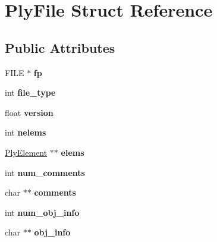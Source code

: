 \hypertarget{struct_ply_file}{}\section{Ply\+File Struct Reference}
\label{struct_ply_file}
\subsection*{Public Attributes}
\begin{DoxyCompactItemize}
\item 
F\+I\+LE $\ast$ {\bfseries fp}\hypertarget{struct_ply_file_affa03cb65d7afdc1b54ba1930da1e0ce}{}\label{struct_ply_file_affa03cb65d7afdc1b54ba1930da1e0ce}

\item 
int {\bfseries file\+\_\+type}\hypertarget{struct_ply_file_ac8f47215e1cab6332c4a91735faceac1}{}\label{struct_ply_file_ac8f47215e1cab6332c4a91735faceac1}

\item 
float {\bfseries version}\hypertarget{struct_ply_file_a54079430fc47c9303c194ecffaf9392d}{}\label{struct_ply_file_a54079430fc47c9303c194ecffaf9392d}

\item 
int {\bfseries nelems}\hypertarget{struct_ply_file_a2d94dc0c534e364b232d1ea41d64c1f1}{}\label{struct_ply_file_a2d94dc0c534e364b232d1ea41d64c1f1}

\item 
\hyperlink{struct_ply_element}{Ply\+Element} $\ast$$\ast$ {\bfseries elems}\hypertarget{struct_ply_file_aa123ddfd8c89539dde7644d121082432}{}\label{struct_ply_file_aa123ddfd8c89539dde7644d121082432}

\item 
int {\bfseries num\+\_\+comments}\hypertarget{struct_ply_file_a033842a20f0620979d992898f6a52a14}{}\label{struct_ply_file_a033842a20f0620979d992898f6a52a14}

\item 
char $\ast$$\ast$ {\bfseries comments}\hypertarget{struct_ply_file_afe9f3f406d4ae2ae20d9ed0bfb9a990f}{}\label{struct_ply_file_afe9f3f406d4ae2ae20d9ed0bfb9a990f}

\item 
int {\bfseries num\+\_\+obj\+\_\+info}\hypertarget{struct_ply_file_aa1a8dc64805585240d50df3192854d18}{}\label{struct_ply_file_aa1a8dc64805585240d50df3192854d18}

\item 
char $\ast$$\ast$ {\bfseries obj\+\_\+info}\hypertarget{struct_ply_file_a5537a09cf69258341126d00e39e13343}{}\label{struct_ply_file_a5537a09cf69258341126d00e39e13343}


\end{DoxyCompactItemize}
